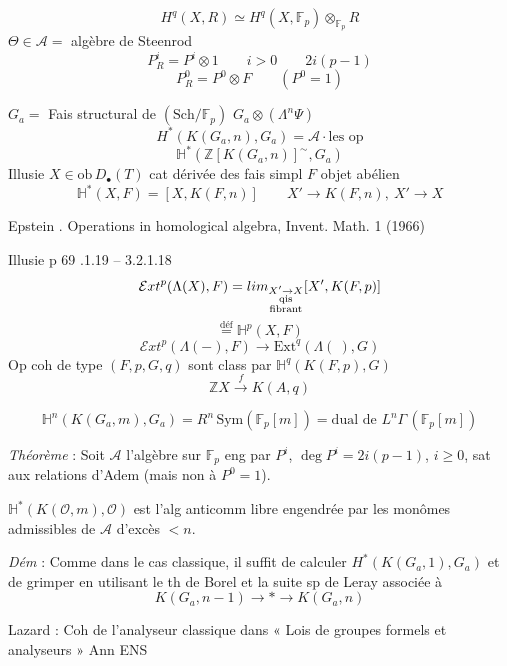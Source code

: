 \documentclass[11pt,a4paper]{article}
\begin{document}
\[
  H^q(X,R) \simeq H^q(X,\mathbb{F}_p)\otimes_{\mathbb{F}_p} R
\]
$\Theta\in\mathcal{A} = {}$ algèbre de Steenrod
\[
  P^i_R = P^i\otimes 1 \qquad i>0 \qquad 2i(p-1)
\]
\[
  P^0_R = P^0\otimes F \qquad (P^0 = 1)
\]

$G_a = {}$ Fais structural de $(\mathrm{Sch}/\mathbb{F}_p)$ \qquad $G_a\otimes(\Lambda^n\Psi)$
\[
  H^{\ast}(K(G_a,n),G_a) = \mathcal{A}\cdot\text{les op}
\]
\[
  \mathbb{H}^{\ast}(\mathbb{Z}[K(G_a,n)]^{\sim},G_a)
\]
Illusie \quad $X\in\mathrm{ob}\,D_\bullet(T)$ \quad cat dérivée des fais simpl \quad $F$ objet abélien
\[
  \mathbb{H}^{\ast}(X,F) = [X,K(F,n)]
  \qquad X' \to K(F,n),\ X' \to X
\]

Epstein . Operations in homological algebra, Invent. Math. 1 (1966)

Illusie p 69 .1.19 -- 3.2.1.18
\[
  \mathcal{E}xt^p(\Lambda(X),F) = \varinjlim_{\substack{X'\to X\\ \text{qis}\\ \text{fibrant}}} [X',K(F,p)]
\]
\[
  \overset{\text{déf}}{=} \mathbb{H}^p(X,F)
\]
\[
  \mathcal{E}xt^p(\Lambda(-),F) \to \mathrm{Ext}^q(\Lambda(\ ),G)
\]
Op coh de type $(F,p,G,q)$ sont class par $\mathbb{H}^q(K(F,p),G)$
\[
  \mathbb{Z}X \xrightarrow{\ f\ } K(A,q)
\]

\[
  \mathbb{H}^n(K(G_a,m),G_a) = R^n\,\mathrm{Sym}(\mathbb{F}_p[m])
  = \text{dual de } L^n\Gamma\,(\mathbb{F}_p[m])
\]

\emph{Théorème} : Soit $\mathcal{A}$ l'algèbre sur $\mathbb{F}_p$ eng par $P^i$, $\deg P^i = 2i(p-1)$, $i\geq 0$, sat aux relations d'Adem (mais non à $P^0 = 1$).

$\mathbb{H}^{\ast}(K(\mathcal{O},m),\mathcal{O})$ est l'alg anticomm libre engendrée par les monômes admissibles de $\mathcal{A}$ d'excès $<n$.

\emph{Dém} : Comme dans le cas classique, il suffit de calculer $H^{\ast}(K(G_a,1),G_a)$ et de grimper en utilisant le th de Borel et la suite sp de Leray associée à
\[
  K(G_a,n-1) \to \ast \to K(G_a,n)
\]

Lazard : Coh de l'analyseur classique dans « Lois de groupes formels et analyseurs » Ann ENS
\end{document}
